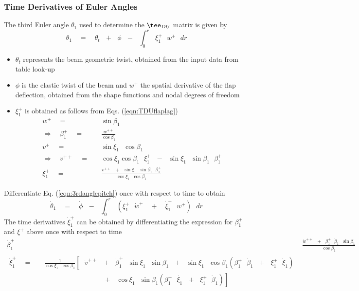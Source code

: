 \subsubsection*{Time Derivatives of Euler Angles}
The third Euler angle $\theta_1$ used to determine the $\tee_{DU}$ matrix is given by
\[ \theta_1 \quad = \quad \theta_t \textrm{ }+ \textrm{ }\phi \textrm{ }- \textrm{ }\int_0^r \textrm{ }\xi_1^+ \textrm{ }w^+ \textrm{ } dr \]
\begin{itemize}
\item $\theta_t$ represents the beam geometric twist, obtained from the input data from table look-up
\item $\phi$ is the elastic twist of the beam and $w^+$ the spatial derivative of the flap deflection, obtained from the shape functions and nodal degrees of freedom
\item $\xi^+_1$ is obtained as follows from Eqs. (\ref{eqn:TDUflaplag})
\begin{align*}
w^+ \quad = \quad & \sin \beta_1 \\
\Rightarrow \quad \beta_1^+ \quad = \quad & \frac{w^{++}}{\cos \beta_1} \\
v^+ \quad = \quad & \sin \xi_1 \textrm{ }\cos \beta_1 \\
\Rightarrow \quad v^{++} \quad = \quad & \cos \xi_1 \cos \beta_1 \textrm{ }\xi_1^+ \textrm{ } - \textrm{ } \sin \xi_1 \textrm{ }\sin \beta_1 \textrm{ }\beta_1^+ \\
\xi_1^+ \quad = \quad & \frac{v^{++} \textrm{ } + \textrm{ } \sin \xi_1 \textrm{ }\sin \beta_1 \textrm{ } \beta_1^+}{\cos \xi_1 \textrm{ }\cos \beta_1} 
\end{align*}
\end{itemize}
Differentiate Eq. (\ref{eqn:3rdanglepitch}) once with respect to time to obtain
\[ \dot{\theta}_1 \quad = \quad \dot{\phi} \textrm{ } - \textrm{ }\int_0^r \textrm{ }\left(\xi_1^+ \textrm{ } \dot{w}^+ \quad  + \quad  \dot{\xi}_1^+ \textrm{ } w^+ \right) \textrm{ } dr \]
The time derivatives $\dot{\xi}_1^+$ can be obtained by differentiating the expression for $\beta_1^+$ and $\xi^+$ above once with respect to time 
\begin{align*}
\dot{\beta}_1^+ \quad = \quad &\frac{\dot{w}^{++} \textrm{ } + \textrm{ } \beta_1^+ \textrm{ }  \dot{\beta}_1 \textrm{ } \sin \beta_1}{\cos \beta_1} \\
\begin{split}
\dot{\xi}^+_1 \quad = \quad &\frac{1}{\cos \xi_1 \textrm{ }\cos \beta_1}  \left[\textrm{ }\dot{v}^{++} \textrm{ }+\textrm{ } \dot{\beta}_1^+ \textrm{ } \sin \xi_1 \textrm{ }\sin \beta_1 \textrm{ }+\textrm{ }\sin \xi_1 \textrm{ }\cos \beta_1 \left(\beta_1^+ \textrm{ }\dot{\beta}_1 \textrm{ }+\textrm{ }\xi_1^+ \textrm{ }\dot{\xi}_1\right) \right. \\
& \left. \qquad \qquad \qquad \textrm{ } \qquad +\textrm{ }\cos \xi_1 \textrm{ }\sin \beta_1 \left(\beta_1^+ \textrm{ }\dot{\xi_1} \textrm{ }+\textrm{ }\xi^+_1 \textrm{ }\dot{\beta}_1\right) \right]
\end{split}
\end{align*}
